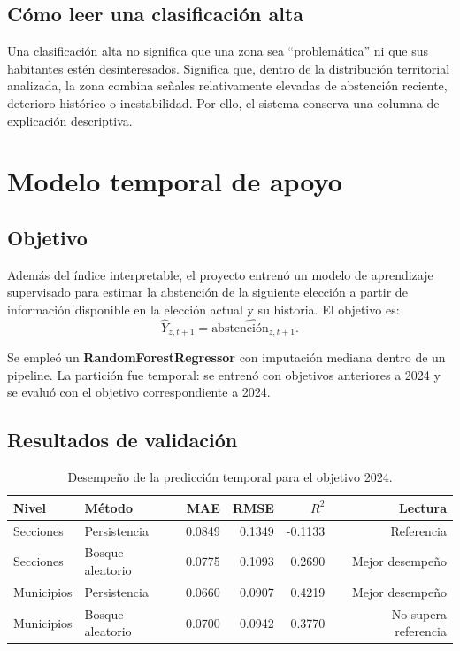 \documentclass[11pt,a4paper]{article}
\begin{document}
\subsection{Cómo leer una clasificación alta}

Una clasificación alta no significa que una zona sea ``problemática'' ni que sus habitantes estén desinteresados. Significa que, dentro de la distribución territorial analizada, la zona combina señales relativamente elevadas de abstención reciente, deterioro histórico o inestabilidad. Por ello, el sistema conserva una columna de explicación descriptiva.

\section{Modelo temporal de apoyo}

\subsection{Objetivo}

Además del índice interpretable, el proyecto entrenó un modelo de aprendizaje supervisado para estimar la abstención de la siguiente elección a partir de información disponible en la elección actual y su historia. El objetivo es:
\[
\widehat{Y}_{z,t+1} = \widehat{\text{abstención}_{z,t+1}}.
\]

Se empleó un \textbf{RandomForestRegressor} con imputación mediana dentro de un pipeline. La partición fue temporal: se entrenó con objetivos anteriores a 2024 y se evaluó con el objetivo correspondiente a 2024.

\subsection{Resultados de validación}

\begin{table}[H]
\centering
\caption{Desempeño de la predicción temporal para el objetivo 2024.}
\label{tab:modelo}
\begin{tabular}{llrrrr}
\toprule
\textbf{Nivel} & \textbf{Método} & \textbf{MAE} & \textbf{RMSE} & \textbf{$R^2$} & \textbf{Lectura}\\
\midrule
Secciones & Persistencia & 0.0849 & 0.1349 & -0.1133 & Referencia\\
Secciones & Bosque aleatorio & 0.0775 & 0.1093 & 0.2690 & Mejor desempeño\\
\midrule
Municipios & Persistencia & 0.0660 & 0.0907 & 0.4219 & Mejor desempeño\\
Municipios & Bosque aleatorio & 0.0700 & 0.0942 & 0.3770 & No supera referencia\\
\bottomrule
\end{tabular}
\end{table}
\end{document}
